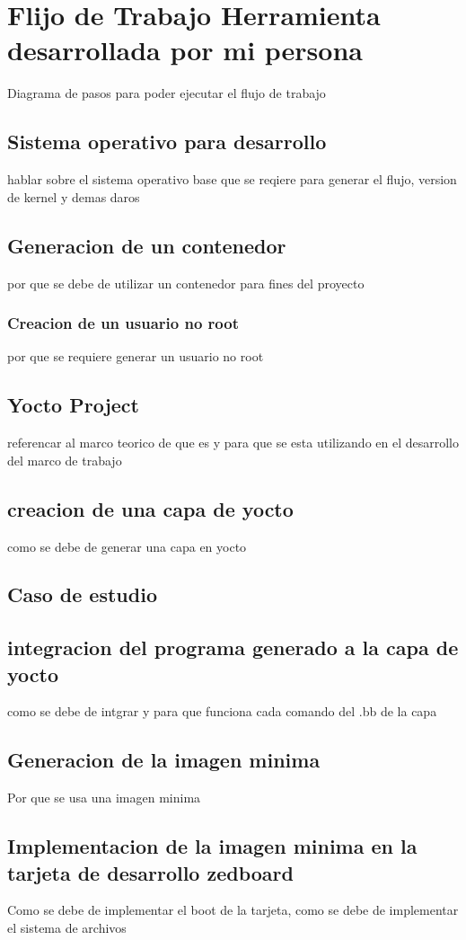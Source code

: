 \section{Flijo de Trabajo Herramienta desarrollada por mi persona}
Diagrama de pasos para poder ejecutar el flujo de trabajo

\subsection{Sistema operativo para desarrollo}
hablar sobre el sistema operativo base que se reqiere para generar el flujo, version de kernel y demas daros 

\subsection{Generacion de un contenedor}
por que se debe de utilizar un contenedor para fines del proyecto
\subsubsection{Creacion de un usuario no root}
por que se requiere generar un usuario no root 
\subsection{Yocto Project}
referencar al marco teorico de que es y para que se esta utilizando en el desarrollo del marco de trabajo
\subsection{creacion de una capa de yocto}
como se debe de generar una capa en yocto
\subsection{Caso de estudio}
\subsection{integracion del programa generado a la capa de yocto}
como se debe de intgrar y para que funciona cada comando del .bb de la capa
\subsection{Generacion de la imagen minima}
Por que se usa una imagen minima 
\subsection{Implementacion de la imagen minima en la tarjeta de desarrollo zedboard}
Como se debe de implementar el boot de la tarjeta, como se debe de implementar el  sistema de archivos
